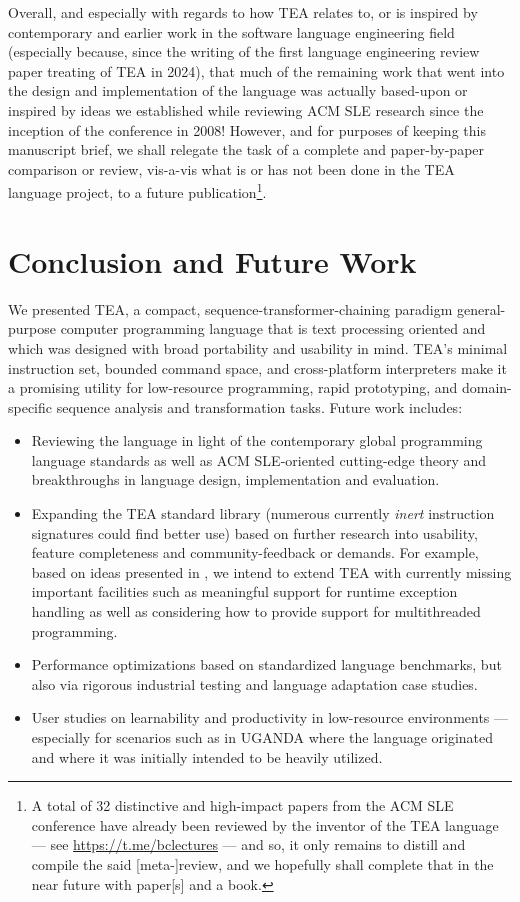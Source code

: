 \documentclass[sigplan,screen]{acmart}
\begin{document}
Overall, and especially with regards to how TEA relates to, or is inspired by contemporary and earlier work in the software language engineering field (especially because, since the writing of the first language engineering review paper treating of TEA \cite{lutalo2024software} in 2024), that much of the remaining work that went into the design and implementation of the language was actually based-upon or inspired by ideas we established while reviewing ACM SLE research since the inception of the conference in 2008! However, and for purposes of keeping this manuscript brief, we shall relegate the task of a complete and paper-by-paper comparison or review, vis-a-vis what is or has not been done in the TEA language project, to a future publication\footnote{A total of 32 distinctive and high-impact papers from the ACM SLE conference have already been reviewed by the inventor of the TEA language --- see \url{https://t.me/bclectures} --- and so, it only remains to distill and compile the said [meta-]review, and we hopefully shall complete that in the near future with paper[s] and a book.}.



\section{Conclusion and Future Work}
\label{SEC10}

We presented TEA, a compact, sequence-transformer-chaining paradigm general-purpose computer programming language that is text processing oriented and which was designed with broad portability and usability in mind. TEA's minimal instruction set, bounded command space, and cross-platform interpreters make it a promising utility for low-resource programming, rapid prototyping, and domain-specific sequence analysis and transformation tasks. Future work includes:
\begin{itemize}
  \item Reviewing the language in light of the contemporary global programming language standards as well as ACM SLE-oriented cutting-edge theory and breakthroughs in language design, implementation and evaluation. 
  \item Expanding the TEA standard library (numerous currently \textit{inert} instruction signatures could find better use) based on further research into usability, feature completeness and community-feedback or demands. For example, based on ideas presented in \cite{zaytsev2020worstnightmare}, we intend to extend TEA with currently missing important facilities such as meaningful support for runtime exception handling as well as considering how to provide support for multithreaded programming. 
  \item Performance optimizations based on standardized language benchmarks, but also via rigorous industrial testing and language adaptation case studies.
  \item User studies on learnability and productivity in low-resource environments --- especially for scenarios such as in UGANDA where the language originated and where it was initially intended to be heavily utilized.
\end{itemize}
\end{document}
